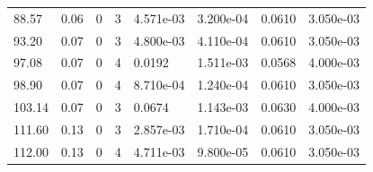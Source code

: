 \documentclass[preview]{standalone}
\begin{document}
{{\begin{tabular}{L{1.2cm}C{1.2cm} C{0.3cm}C{0.5cm} C{1.4cm}C{1.4cm} C{1.4cm}C{1.4cm}}
  88.57  &  0.06  & 0     &  3 &  4.571e-03  & 3.200e-04  & 0.0610 &  3.050e-03   \\ 
  93.20  &  0.07  & 0     &  3 &  4.800e-03  & 4.110e-04  & 0.0610 &  3.050e-03   \\ 
  97.08  &  0.07  & 0     &  4 &  0.0192  & 1.511e-03  & 0.0568 &  4.000e-03   \\ 
  98.90  &  0.07  & 0     &  4 &  8.710e-04  & 1.240e-04  & 0.0610 &  3.050e-03   \\ 
  103.14  &  0.07  & 0     &  3 &  0.0674  & 1.143e-03  & 0.0630 &  4.000e-03   \\ 
  111.60  &  0.13  & 0     &  3 &  2.857e-03  & 1.710e-04  & 0.0610 &  3.050e-03   \\ 
  112.00  &  0.13  & 0     &  4 &  4.711e-03  & 9.800e-05  & 0.0610 &  3.050e-03   \\ 
\hline 
\end{tabular} 

}}
\end{document}
